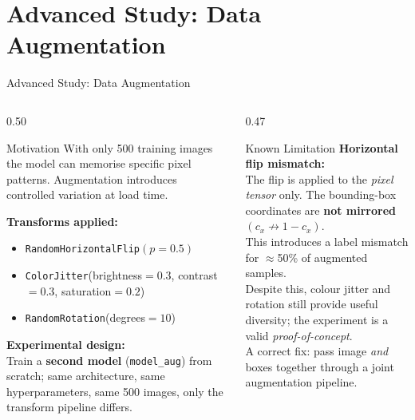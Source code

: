 \documentclass[aspectratio=169, 10pt]{beamer}
\begin{document}
\section{Advanced Study: Data Augmentation}

\begin{frame}{Advanced Study: Data Augmentation}
\begin{columns}[T]
\begin{column}{0.50\textwidth}
  \begin{block}{Motivation}
    With only 500 training images the model can memorise
    specific pixel patterns. Augmentation introduces
    controlled variation at load time.
  \end{block}

  \vspace{0.1cm}
  \textbf{Transforms applied:}
  \begin{itemize}
    \item \texttt{RandomHorizontalFlip}$(p=0.5)$
    \item \texttt{ColorJitter}(brightness$=0.3$, contrast$=0.3$, saturation$=0.2$)
    \item \texttt{RandomRotation}(degrees$=10$)
  \end{itemize}

  \vspace{0.1cm}
  \textbf{Experimental design:}\\
  Train a \textbf{second model} (\texttt{model\_aug}) from scratch;
  same architecture, same hyperparameters, same 500 images,
  only the transform pipeline differs.
\end{column}
\begin{column}{0.47\textwidth}
  \begin{alertblock}{Known Limitation}
    \textbf{Horizontal flip mismatch:}\\[4pt]
    The flip is applied to the \emph{pixel tensor} only.
    The bounding-box coordinates are \textbf{not mirrored}
    $(c_x \not\to 1-c_x)$.\\[4pt]
    This introduces a label mismatch for $\approx$50\% of
    augmented samples.\\[4pt]
    Despite this, colour jitter and rotation still provide
    useful diversity; the experiment is a valid
    \textit{proof-of-concept}.\\[4pt]
    A correct fix: pass image \emph{and} boxes together
    through a joint augmentation pipeline.
  \end{alertblock}
\end{column}
\end{columns}
\end{frame}
\end{document}

